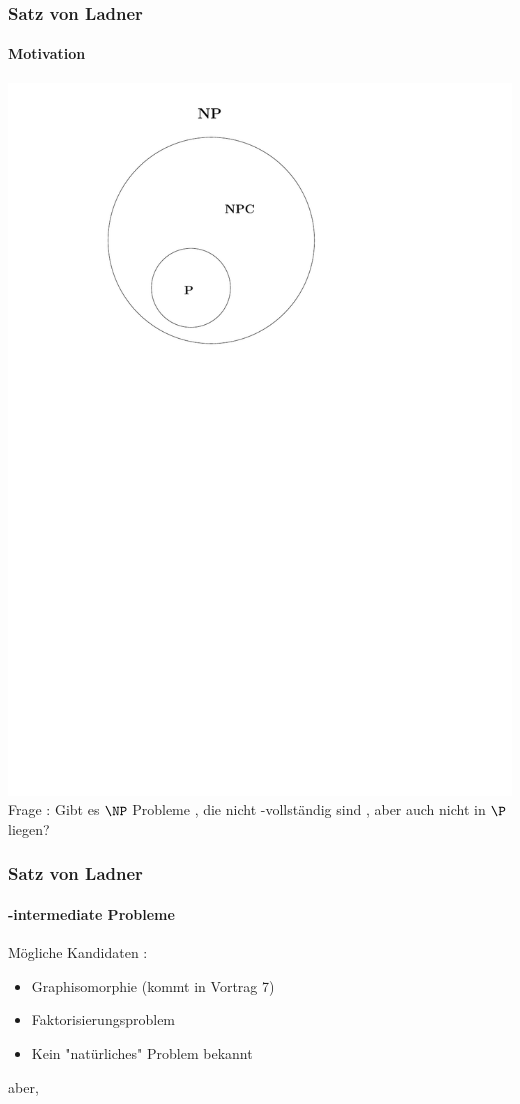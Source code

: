 \begin{frame}
	\frametitle{Satz von Ladner}
	\framesubtitle{Motivation}
	\includegraphics[page = 2,scale = 0.6]{images/npi.pdf}
	Frage : Gibt es $\NP$  Probleme , die nicht \NP -vollständig sind , aber auch
	nicht in $\P$  liegen?
\end{frame}
\begin{frame}
	\frametitle{Satz von Ladner}
	\framesubtitle{\NP -intermediate Probleme}
	Mögliche Kandidaten :
	\begin{itemize}
	\item Graphisomorphie (kommt in Vortrag 7)
	\item Faktorisierungsproblem
	\item Kein "natürliches" Problem bekannt
	\end{itemize}
	
	aber,
\end{frame}

